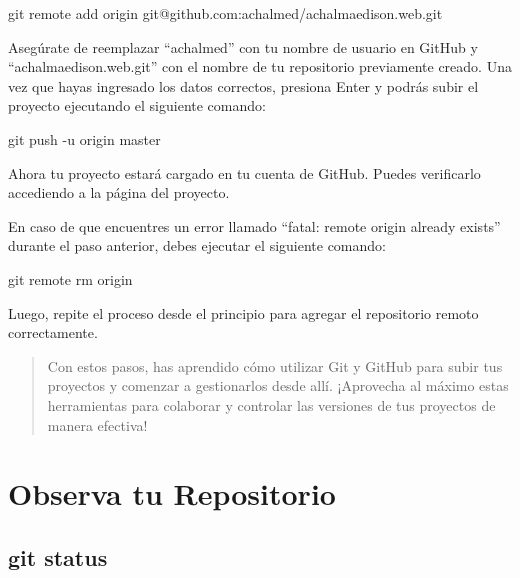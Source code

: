 \documentclass[
  a4paper,
]{article}
\newenvironment{Shaded}{}{}
\newcommand{\AttributeTok}[1]{\textcolor[rgb]{0.84,0.23,0.29}{#1}}
\newcommand{\FunctionTok}[1]{\textcolor[rgb]{0.44,0.26,0.76}{#1}}
\newcommand{\NormalTok}[1]{\textcolor[rgb]{0.14,0.16,0.18}{#1}}
\begin{document}
\begin{Shaded}
\begin{Highlighting}[]
\FunctionTok{git}\NormalTok{ remote add origin git@github.com:achalmed/achalmaedison.web.git}
\end{Highlighting}
\end{Shaded}

Asegúrate de reemplazar ``achalmed'' con tu nombre de usuario en GitHub
y ``achalmaedison.web.git'' con el nombre de tu repositorio previamente
creado. Una vez que hayas ingresado los datos correctos, presiona Enter
y podrás subir el proyecto ejecutando el siguiente comando:

\begin{Shaded}
\begin{Highlighting}[]
\FunctionTok{git}\NormalTok{ push }\AttributeTok{{-}u}\NormalTok{ origin master}
\end{Highlighting}
\end{Shaded}

Ahora tu proyecto estará cargado en tu cuenta de GitHub. Puedes
verificarlo accediendo a la página del proyecto.

En caso de que encuentres un error llamado ``fatal: remote origin
already exists'' durante el paso anterior, debes ejecutar el siguiente
comando:

\begin{Shaded}
\begin{Highlighting}[]
\FunctionTok{git}\NormalTok{ remote rm origin}
\end{Highlighting}
\end{Shaded}

Luego, repite el proceso desde el principio para agregar el repositorio
remoto correctamente.

\begin{quote}
Con estos pasos, has aprendido cómo utilizar Git y GitHub para subir tus
proyectos y comenzar a gestionarlos desde allí. ¡Aprovecha al máximo
estas herramientas para colaborar y controlar las versiones de tus
proyectos de manera efectiva!
\end{quote}

\section{Observa tu Repositorio}\label{observa-tu-repositorio}

\subsection{git status}\label{git-status}
\end{document}
